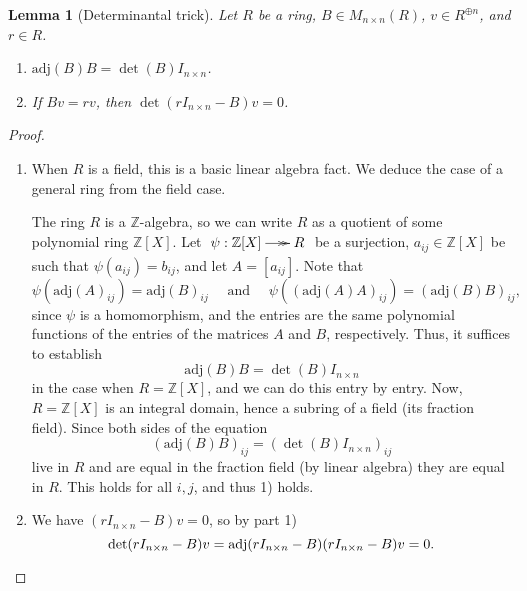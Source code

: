 \documentclass{amsart}[12pt]
\newcommand{\ZZ}{\mathbb{Z}}
\numberwithin{equation}{section}
\theoremstyle{plain} %
\newtheorem{lemma}[equation]{Lemma}
\theoremstyle{definition}
\theoremstyle{remark}
\begin{document}
\begin{lemma}[Determinantal trick]\label{determinantal trick}
Let $R$ be a ring, $B \in M_{n\times n}(R)$, $v\in R^{\oplus n}$, and $r\in R$.
	\begin{enumerate}
		\item $\mathrm{adj}(B) B = \det(B) I_{n\times n}$.
		\item If $B v = r v$, then $\det(r I_{n\times n} - B) v=0$.
	\end{enumerate} 
\end{lemma}



\begin{proof}
	\begin{enumerate}
		\item When $R$ is a field, this is a basic linear algebra fact. We deduce the case of a general ring from the field case.
		
		The ring $R$ is a $\ZZ$-algebra, so we can write $R$ as a quotient of some polynomial ring $\ZZ[X]$. Let $\xymatrix@C=6mm{\psi:\ZZ[X] \ar@{->>}[r] & R}$ be a surjection, $a_{ij}\in \ZZ[X]$ be such that $\psi(a_{ij})=b_{ij}$, and let $A=[a_{ij}]$. Note that
		\[\psi(\mathrm{adj}(A)_{ij})=\mathrm{adj}(B)_{ij} \quad \textrm{ and } \quad \psi((\mathrm{adj}(A) A)_{ij}) = (\mathrm{adj}(B) B)_{ij},\] 
		since $\psi$ is a homomorphism, and the entries are the same polynomial functions of the entries of the matrices $A$ and $B$, respectively. Thus, it suffices to establish 
		\[\mathrm{adj}(B) B = \det(B) I_{n\times n}\]
		in the case when $R=\ZZ[X]$, and we can do this entry by entry. Now, $R=\ZZ[X]$ is an integral domain, hence a subring of a field (its fraction field). Since both sides of the equation 
		\[\left( \mathrm{adj}(B) B \right)_{ij} = \left( \det(B) I_{n\times n}\right)_{ij}\]
		live in $R$ and are equal in the fraction field (by linear algebra) they are equal in $R$. This holds for all $i, j$, and thus 1) holds.
		
		\item We have $(r I_{n\times n} - B) v=0$, so by part 1)
	\[
\det(r I_{n\times n} - B) v=\mathrm{adj}(r I_{n\times n} - B) (r I_{n\times n} - B) v = 0.\qedhere\]
	\end{enumerate}
\end{proof}
\end{document}
